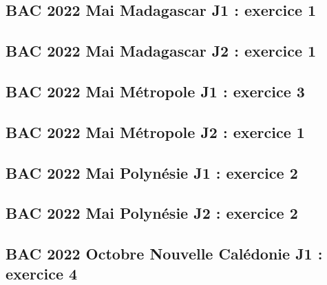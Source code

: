 \documentclass[lang=fr,edition=teacher,layout=sheet]{mxbook}
\begin{document}
\begingroup\endgroup
\par\bigskip
{}\subsection*{BAC 2022 Mai Madagascar J1 : exercice 1}
\begingroup\endgroup
\par\bigskip
{}\subsection*{BAC 2022 Mai Madagascar J2 : exercice 1}
\begingroup\endgroup
\par\bigskip
{}\subsection*{BAC 2022 Mai Métropole J1 : exercice 3}
\begingroup\endgroup
\par\bigskip
{}\subsection*{BAC 2022 Mai Métropole J2 : exercice 1}
\begingroup\endgroup
\par\bigskip
{}\subsection*{BAC 2022 Mai Polynésie J1 : exercice 2}
\begingroup\endgroup
\par\bigskip
{}\subsection*{BAC 2022 Mai Polynésie J2 : exercice 2}
\begingroup\endgroup
\par\bigskip
{}\subsection*{BAC 2022 Octobre Nouvelle Calédonie J1 : exercice 4}
\end{document}
